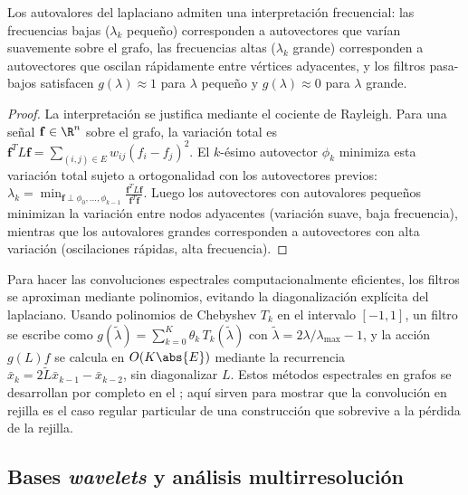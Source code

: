 \begin{theorem}
\label{thm:grids:freq-interp-graphs}
Los autovalores del laplaciano admiten una interpretaci\'on frecuencial: las
frecuencias bajas ($\lambda_k$ peque\~no) corresponden a autovectores que
var\'ian suavemente sobre el grafo, las frecuencias altas ($\lambda_k$ grande)
corresponden a autovectores que oscilan r\'apidamente entre v\'ertices
adyacentes, y los filtros pasa-bajos satisfacen $g(\lambda) \approx 1$ para
$\lambda$ peque\~no y $g(\lambda) \approx 0$ para $\lambda$ grande.
\end{theorem}

\begin{proof}
La interpretaci\'on se justifica mediante el cociente de Rayleigh. Para una
se\~nal $\mathbf{f} \in \R^n$ sobre el grafo, la variaci\'on total es
$\mathbf{f}^T L \mathbf{f} = \sum_{(i,j) \in E} w_{ij}(f_i - f_j)^2$. El
$k$-\'esimo autovector $\phi_k$ minimiza esta variaci\'on total sujeto a
ortogonalidad con los autovectores previos:
$\lambda_k = \min_{\mathbf{f} \perp \phi_0, \ldots, \phi_{k-1}}
\frac{\mathbf{f}^T L \mathbf{f}}{\mathbf{f}^T \mathbf{f}}$. Luego los
autovectores con autovalores peque\~nos minimizan la variaci\'on entre nodos
adyacentes (variaci\'on suave, baja frecuencia), mientras que los autovalores
grandes corresponden a autovectores con alta variaci\'on (oscilaciones
r\'apidas, alta frecuencia).
\end{proof}

Para hacer las convoluciones espectrales computacionalmente eficientes, los
filtros se aproximan mediante polinomios, evitando la diagonalizaci\'on
expl\'icita del laplaciano. Usando polinomios de Chebyshev $T_k$ en el intervalo
$[-1, 1]$, un filtro se escribe como $g(\tilde{\lambda}) = \sum_{k=0}^K \theta_k\,
T_k(\tilde{\lambda})$ con $\tilde{\lambda} = 2\lambda/\lambda_{\max} - 1$, y la
acci\'on $g(L)f$ se calcula en $O(K\abs{E})$ mediante la recurrencia
$\bar{x}_k = 2\tilde{L}\bar{x}_{k-1} - \bar{x}_{k-2}$, sin diagonalizar $L$.
Estos m\'etodos espectrales en grafos se desarrollan por completo en el
; aqu\'i sirven para mostrar que la convoluci\'on en rejilla es
el caso regular particular de una construcci\'on que sobrevive a la p\'erdida de
la rejilla.

\subsection{Bases \emph{wavelets} y an\'alisis multirresoluci\'on}
\label{sec:grids:wavelets}

